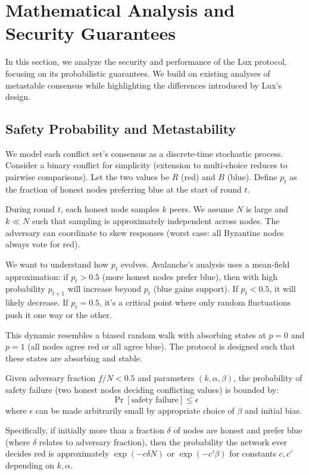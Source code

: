 \section{Mathematical Analysis and Security Guarantees}

In this section, we analyze the security and performance of the Lux protocol, focusing on its probabilistic guarantees. We build on existing analyses of metastable consensus while highlighting the differences introduced by Lux's design.

\subsection{Safety Probability and Metastability}

We model each conflict set's consensus as a discrete-time stochastic process. Consider a binary conflict for simplicity (extension to multi-choice reduces to pairwise comparisons). Let the two values be $R$ (red) and $B$ (blue). Define $p_t$ as the fraction of honest nodes preferring blue at the start of round $t$.

During round $t$, each honest node samples $k$ peers. We assume $N$ is large and $k \ll N$ such that sampling is approximately independent across nodes. The adversary can coordinate to skew responses (worst case: all Byzantine nodes always vote for red).

We want to understand how $p_t$ evolves. Avalanche's analysis uses a mean-field approximation: if $p_t > 0.5$ (more honest nodes prefer blue), then with high probability $p_{t+1}$ will increase beyond $p_t$ (blue gains support). If $p_t < 0.5$, it will likely decrease. If $p_t = 0.5$, it's a critical point where only random fluctuations push it one way or the other.

This dynamic resembles a biased random walk with absorbing states at $p=0$ and $p=1$ (all nodes agree red or all agree blue). The protocol is designed such that these states are absorbing and stable.

\begin{theorem}
Given adversary fraction $f/N < 0.5$ and parameters $(k,\alpha,\beta)$, the probability of safety failure (two honest nodes deciding conflicting values) is bounded by:
$$\Pr[\text{safety failure}] \leq \epsilon$$
where $\epsilon$ can be made arbitrarily small by appropriate choice of $\beta$ and initial bias.
\end{theorem}

Specifically, if initially more than a fraction $\delta$ of nodes are honest and prefer blue (where $\delta$ relates to adversary fraction), then the probability the network ever decides red is approximately $\exp(-c \delta N)$ or $\exp(-c' \beta)$ for constants $c, c'$ depending on $k, \alpha$.

